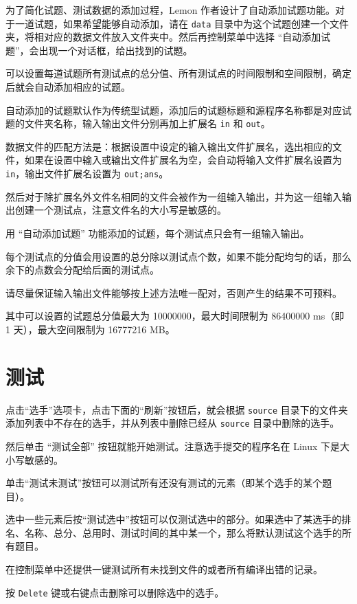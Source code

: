 \documentclass[UTF-8]{ctexart}
\begin{document}
			为了简化试题、测试数据的添加过程，Lemon 作者设计了自动添加试题功能。对于一道试题，如果希望能够自动添加，请在 \texttt{data} 目录中为这个试题创建一个文件夹，将相对应的数据文件放入文件夹中。然后再控制菜单中选择 “自动添加试题”，会出现一个对话框，给出找到的试题。

			可以设置每道试题所有测试点的总分值、所有测试点的时间限制和空间限制，确定后就会自动添加相应的试题。

			自动添加的试题默认作为传统型试题，添加后的试题标题和源程序名称都是对应试题的文件夹名称，输入输出文件分别再加上扩展名 \texttt{in} 和 \texttt{out}。

			数据文件的匹配方法是：根据设置中设定的输入输出文件扩展名，选出相应的文件，如果在设置中输入或输出文件扩展名为空，会自动将输入文件扩展名设置为 \texttt{in}，输出文件扩展名设置为 \texttt{out;ans}。

			然后对于除扩展名外文件名相同的文件会被作为一组输入输出，并为这一组输入输出创建一个测试点，注意文件名的大小写是敏感的。

			用 “自动添加试题” 功能添加的试题，每个测试点只会有一组输入输出。

			每个测试点的分值会用设置的总分除以测试点个数，如果不能分配均匀的话，那么余下的点数会分配给后面的测试点。

			请尽量保证输入输出文件能够按上述方法唯一配对，否则产生的结果不可预料。

			其中可以设置的试题总分值最大为 10000000，最大时间限制为 86400000 ms（即 1 天），最大空间限制为 16777216 MB。

	\newpage

	\section{测试}

		点击“选手”选项卡，点击下面的“刷新”按钮后，就会根据 \texttt{source} 目录下的文件夹添加列表中不存在的选手，并从列表中删除已经从 \texttt{source} 目录中删除的选手。

		然后单击 “测试全部” 按钮就能开始测试。注意选手提交的程序名在 Linux 下是大小写敏感的。

		单击“测试未测试”按钮可以测试所有还没有测试的元素（即某个选手的某个题目）。

		选中一些元素后按“测试选中”按钮可以仅测试选中的部分。如果选中了某选手的排名、名称、总分、总用时、测试时间的其中某一个，那么将默认测试这个选手的所有题目。

		在控制菜单中还提供一键测试所有未找到文件的或者所有编译出错的记录。

		按 \texttt{Delete} 键或右键点击删除可以删除选中的选手。
\end{document}
